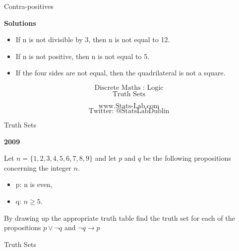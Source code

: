 {Contra-positives}

\textbf{Solutions}
\begin{itemize}
\item If n is not divisible by 3, then n is not equal to 12.
\item If n is not positive, then n is not equal to 5.
\item If the four sides are not equal, then the quadrilateral is not a square.
\end{itemize}




\[\mbox{Discrete Maths :  Logic}\]
\[\mbox{Truth Sets}\]
\bigskip

\[\mbox{www.Stats-Lab.com}\]
\[\mbox{Twitter: @StatsLabDublin}\]




{Truth Sets}


\textbf{2009} 

Let $n = \{1, 2,3,4, 5,6,7, 8, 9\}$ and let $p$ and  $q$ be the following propositions concerning the integer $n$.
\begin{itemize}
\item p: n is even, 
\item q: $n\geq 5$.
\end{itemize}
By drawing up the appropriate truth table ﬁnd the truth set for each of the
propositions $p \vee \neg q$ and $ \neg q \rightarrow p$



{Truth Sets}

